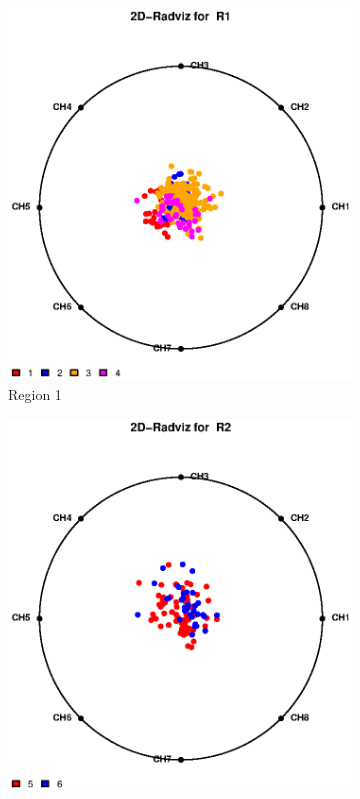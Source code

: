 \documentclass{article}
\begin{document}
\begin{enumerate}[leftmargin = 0 em, label = \arabic*., font = \bfseries]
\begin{enumerate}
        \begin{figure}
        \centering
          \begin{subfigure}[b]{.33\textwidth}
            \centering
            \includegraphics[width = \textwidth]{R1.eps}
            \caption{Region 1}
            \label{R1}
          \end{subfigure}%
          \begin{subfigure}[b]{.33\textwidth}
            \centering
            \includegraphics[width = \textwidth]{R2.eps}

\end{subfigure}
\end{figure}
\end{enumerate}
\end{enumerate}
\end{document}

